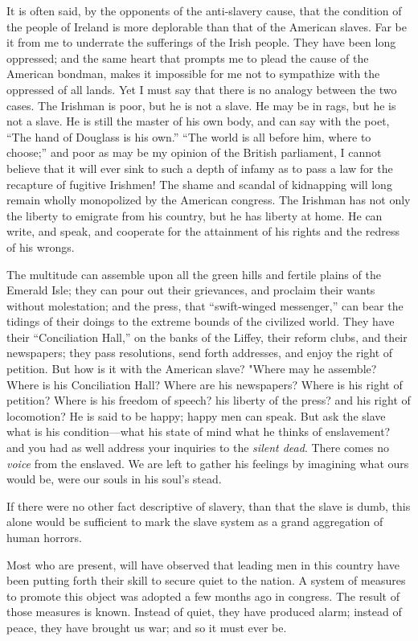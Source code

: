 It is often said, by the opponents of the anti-slavery cause, that the
condition of the people of Ireland is more deplorable than that of the
American slaves. Far be it from me to underrate the sufferings of the
Irish people. They have been long oppressed; and the same heart that
prompts me to plead the cause of the American bondman, makes it
impossible for me not to sympathize with the oppressed of all lands. Yet
I must say that there is no analogy between the two cases. The Irishman
is poor, but he is not a slave. He may be in rags, but he is not a
slave. He is still the master of his own body, and can say with the
poet, ``The hand of Douglass is his own.'' ``The world is all before
him, where to choose;'' and poor as may be my opinion of the British
parliament, I cannot believe that it will ever sink to such a depth of
infamy as to pass a law for the recapture of fugitive Irishmen! The
shame and scandal of kidnapping will long remain wholly monopolized by
the American congress. The Irishman has not only the liberty to emigrate
from his country, but he has liberty at home. He can write, and speak,
and cooperate for the attainment of his rights and the redress of his
wrongs.

The multitude can assemble upon all the green hills and fertile plains
of the Emerald Isle; they can pour out their grievances, and proclaim
their wants without molestation; and the press, that ``swift-winged
messenger,'' can bear the tidings of their doings to the extreme bounds
of the civilized world. They have their ``Conciliation Hall,'' on the
banks of the Liffey, their reform clubs, and their newspapers; they pass
resolutions, send forth addresses, and enjoy the right of petition. But
how is it with the American {}slave? "Where may he assemble? Where is
his Conciliation Hall? Where are his newspapers? Where is his right of
petition? Where is his freedom of speech? his liberty of the press? and
his right of locomotion? He is said to be happy; happy men can speak.
But ask the slave what is his condition---what his state of mind what he
thinks of enslavement? and you had as well address your inquiries to the
\emph{silent dead}. There comes no \emph{voice} from the enslaved. We
are left to gather his feelings by imagining what ours would be, were
our souls in his soul's stead.

If there were no other fact descriptive of slavery, than that the slave
is dumb, this alone would be sufficient to mark the slave system as a
grand aggregation of human horrors.

Most who are present, will have observed that leading men in this
country have been putting forth their skill to secure quiet to the
nation. A system of measures to promote this object was adopted a few
months ago in congress. The result of those measures is known. Instead
of quiet, they have produced alarm; instead of peace, they have brought
us war; and so it must ever be.

